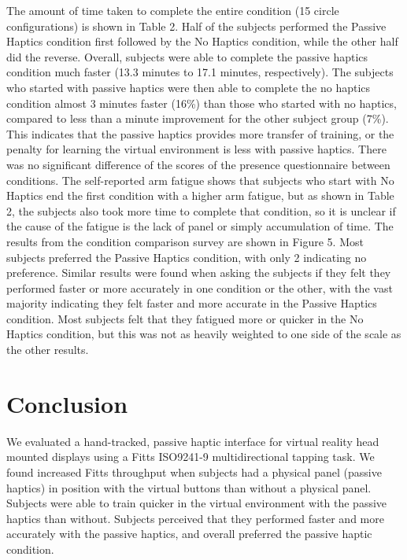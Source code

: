 \documentclass[]{aiaa-tc}%
\begin{document}
The amount of time taken to complete the entire condition (15 circle configurations) is shown in Table 2.
Half of the subjects performed the Passive Haptics condition first followed by the No Haptics condition, while the other half did the reverse.
Overall, subjects were able to complete the passive haptics condition much faster (13.3 minutes to 17.1 minutes, respectively).
The subjects who started with passive haptics were then able to complete the no haptics condition almost 3 minutes faster (16\%) than those who started with no haptics, compared to less than a minute improvement for the other subject group (7\%).
This indicates that the passive haptics provides more transfer of training, or the penalty for learning the virtual environment is less with passive haptics.
There was no significant difference of the scores of the presence questionnaire between conditions.
The self-reported arm fatigue shows that subjects who start with No Haptics end the first condition with a higher arm fatigue, but as shown in Table 2, the subjects also took more time to complete that condition, so it is unclear if the cause of the fatigue is the lack of panel or simply accumulation of time.
The results from the condition comparison survey are shown in Figure 5.
Most subjects preferred the Passive Haptics condition, with only 2 indicating no preference.
Similar results were found when asking the subjects if they felt they performed faster or more accurately in one condition or the other, with the vast majority indicating they felt faster and more accurate in the Passive Haptics condition.
Most subjects felt that they fatigued more or quicker in the No Haptics condition, but this was not as heavily weighted to one side of the scale as the other results.


\section{Conclusion}
We evaluated a hand-tracked, passive haptic interface for virtual reality head mounted displays using a Fitts ISO9241-9 multidirectional tapping task.
We found increased Fitts throughput when subjects had a physical panel (passive haptics) in position with the virtual buttons than without a physical panel.
Subjects were able to train quicker in the virtual environment with the passive haptics than without.
Subjects perceived that they performed faster and more accurately with the passive haptics, and overall preferred the passive haptic condition.



%
%
\end{document}

